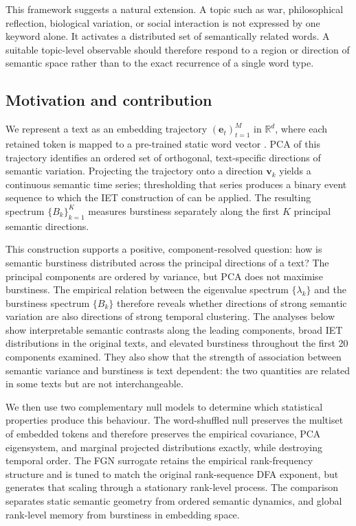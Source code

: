 \documentclass[12pt,a4paper]{article}
\newcommand{\R}{\mathbb{R}}
\begin{document}
This framework suggests a natural extension.
A topic such as war, philosophical reflection, biological variation, or
social interaction is not expressed by one keyword alone.
It activates a distributed set of semantically related words.
A suitable topic-level observable should therefore respond to a region
or direction of semantic space rather than to the exact recurrence of a
single word type.

\subsection{Motivation and contribution}

We represent a text as an embedding trajectory
$(\mathbf{e}_t)_{t=1}^M$ in $\R^d$, where each retained token is mapped
to a pre-trained static word vector
\citep{Mikolov2013,Pennington2014}.
PCA of this trajectory identifies an ordered set of orthogonal,
text-specific directions of semantic variation.
Projecting the trajectory onto a direction $\mathbf{v}_k$ yields a
continuous semantic time series; thresholding that series produces a
binary event sequence to which the IET construction of
\citet{Altmann2012} can be applied.
The resulting spectrum $\{B_k\}_{k=1}^K$ measures burstiness separately
along the first $K$ principal semantic directions.

This construction supports a positive, component-resolved question:
how is semantic burstiness distributed across the principal directions
of a text?
The principal components are ordered by variance, but PCA does not
maximise burstiness.
The empirical relation between the eigenvalue spectrum
$\{\lambda_k\}$ and the burstiness spectrum $\{B_k\}$ therefore reveals
whether directions of strong semantic variation are also directions of
strong temporal clustering.
The analyses below show interpretable semantic contrasts along the
leading components, broad IET distributions in the original texts, and
elevated burstiness throughout the first 20 components examined.
They also show that the strength of association between semantic
variance and burstiness is text dependent: the two quantities are
related in some texts but are not interchangeable.

We then use two complementary null models to determine which statistical
properties produce this behaviour.
The word-shuffled null preserves the multiset of embedded tokens and
therefore preserves the empirical covariance, PCA eigensystem, and
marginal projected distributions exactly, while destroying temporal
order.
The FGN surrogate retains the empirical rank-frequency structure and is
tuned to match the original rank-sequence DFA exponent, but generates
that scaling through a stationary rank-level process.
The comparison separates static semantic geometry from ordered semantic
dynamics, and global rank-level memory from burstiness in embedding
space.
\end{document}
